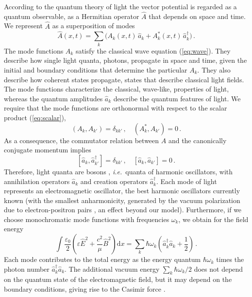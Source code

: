 \documentclass[12pt,amsmath,amssymb]{article}
\numberwithin{equation}{section}
\begin{document}
According to the quantum theory of light
\cite{Cohen,Loudon,MandelWolf}
the vector potential is regarded as a quantum observable,
as a Hermitian operator $\hat{A}$ that depends on space and time.
We represent $\hat{A}$ as a superposition of modes
\begin{equation}
\label{eq:modeex}
\hat{A}(x,t) = \sum_k \Big(A_k(x,t)\,\hat{a}_k+
A_k^*(x,t)\,\hat{a}^\dagger_k \Big)\,.
\end{equation}
The mode functions $A_k$ satisfy the classical wave equation
(\ref{eq:wave}). They describe how single light quanta, photons,
propagate in space and time, given the initial and boundary conditions
that determine the particular $A_k$.
They also describe how coherent states
\cite{Leonhardt,Loudon,MandelWolf}
propagate, states that describe classical light fields.
The mode functions characterize the classical, wave-like,
properties of light, whereas the quantum amplitudes $\hat{a}_k$
describe the quantum features of light.
We require that the mode functions are orthonormal with respect
to the scalar product (\ref{eq:scalar}),
\begin{equation}
\label{eq:orthonorm}
\left(A_k, A_{k'}\right) = \delta_{kk'}\,,\quad
\left(A_k^*, A_{k'}\right) =0\,.
\end{equation}
As a consequence, the commutator relation between $\hat{A}$
and the canonically conjugate momentum \cite{Weinberg} implies
\begin{equation}
\label{eq:comm}
[\hat{a}_k, \hat{a}_{k'}^\dagger] =  \delta_{kk'}
\,,\quad
[\hat{a}_k, \hat{a}_{k'}] =  0
\,.
\end{equation}
Therefore, light quanta are bosons \cite{Weinberg},
{\it i.e.}\  quanta of harmonic oscillators,
with annihilation operators $\hat{a}_k$ and creation operators
$\hat{a}_k^\dagger$.
Each mode of light represents an electromagnetic oscillator,
the best harmonic oscillators currently known
(with the smallest anharmonicity,
generated by the vacuum polarization
due to electron-positron pairs \cite{HeisenbergEuler,Milonni},
an effect beyond our model).
Furthermore, if we choose monochromatic mode functions with
frequencies $\omega_k$, we obtain for the field energy
\begin{equation}
\int \frac{\varepsilon_0}{2}
\left(\varepsilon \hat{E}^2 +\frac{c^2}{\mu} \hat{B}^2\right) {\mathrm d}x =
\sum_k \hbar\omega_k \left(\hat{a}_k^\dagger\hat{a}_k + \frac{1}{2}\right)\,.
\end{equation}
Each mode contributes to the total energy
as the energy quantum $\hbar\omega_k$ times the photon number
$\hat{a}_k^\dagger\hat{a}_k$.
The additional vacuum energy $\sum_k\hbar\omega_k/2$
does not depend on the quantum state of the electromagnetic field,
but it may depend on the boundary conditions,
giving rise to the Casimir force \cite{Barash,Chan,Lamoreaux,Milonni}.
\end{document}
